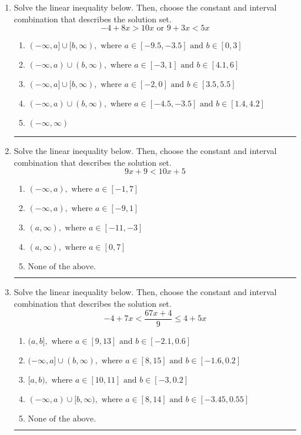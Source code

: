\documentclass[14pt]{extbook}
\newcommand{\litem}[1]{\item#1\hspace*{-1cm}\rule{\textwidth}{0.4pt}}
\begin{document}
\begin{enumerate}
{\begin{enumerate}[label=\Alph*.]
\end{enumerate} }
\litem{
Solve the linear inequality below. Then, choose the constant and interval combination that describes the solution set.\[ -4 + 8 x > 10 x \text{ or } 9 + 3 x < 5 x \]\begin{enumerate}[label=\Alph*.]
\item \( (-\infty, a] \cup [b, \infty), \text{ where } a \in [-9.5, -3.5] \text{ and } b \in [0, 3] \)
\item \( (-\infty, a) \cup (b, \infty), \text{ where } a \in [-3, 1] \text{ and } b \in [4.1, 6] \)
\item \( (-\infty, a] \cup [b, \infty), \text{ where } a \in [-2, 0] \text{ and } b \in [3.5, 5.5] \)
\item \( (-\infty, a) \cup (b, \infty), \text{ where } a \in [-4.5, -3.5] \text{ and } b \in [1.4, 4.2] \)
\item \( (-\infty, \infty) \)

\end{enumerate} }
\litem{
Solve the linear inequality below. Then, choose the constant and interval combination that describes the solution set.\[ 9x + 9 < 10x + 5 \]\begin{enumerate}[label=\Alph*.]
\item \( (-\infty, a), \text{ where } a \in [-1, 7] \)
\item \( (-\infty, a), \text{ where } a \in [-9, 1] \)
\item \( (a, \infty), \text{ where } a \in [-11, -3] \)
\item \( (a, \infty), \text{ where } a \in [0, 7] \)
\item \( \text{None of the above}. \)

\end{enumerate} }
\litem{
Solve the linear inequality below. Then, choose the constant and interval combination that describes the solution set.\[ -4 + 7 x < \frac{67 x + 4}{9} \leq 4 + 5 x \]\begin{enumerate}[label=\Alph*.]
\item \( (a, b], \text{ where } a \in [9, 13] \text{ and } b \in [-2.1, 0.6] \)
\item \( (-\infty, a] \cup (b, \infty), \text{ where } a \in [8, 15] \text{ and } b \in [-1.6, 0.2] \)
\item \( [a, b), \text{ where } a \in [10, 11] \text{ and } b \in [-3, 0.2] \)
\item \( (-\infty, a) \cup [b, \infty), \text{ where } a \in [8, 14] \text{ and } b \in [-3.45, 0.55] \)
\item \( \text{None of the above.} \)

\end{enumerate} }
\end{enumerate}
\end{document}
